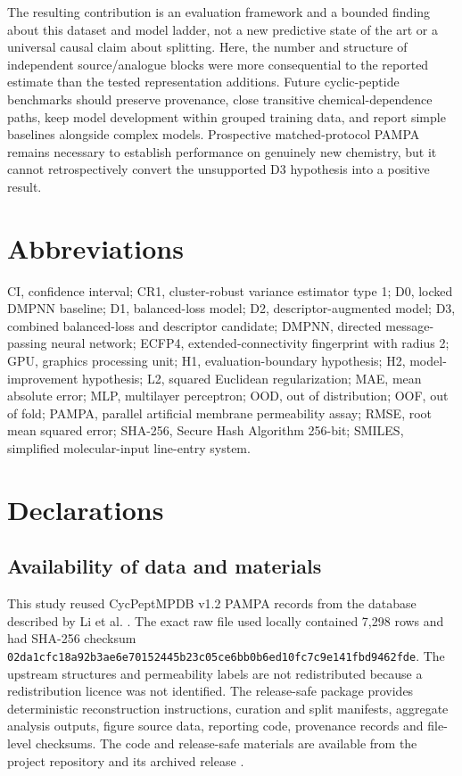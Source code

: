 \documentclass[referee,lineno,pdflatex,sn-vancouver-num]{sn-jnl}
\begin{document}
The resulting contribution is an evaluation framework and a bounded finding about this dataset and model ladder, not a new predictive state of the art or a universal causal claim about splitting. Here, the number and structure of independent source/analogue blocks were more consequential to the reported estimate than the tested representation additions. Future cyclic-peptide benchmarks should preserve provenance, close transitive chemical-dependence paths, keep model development within grouped training data, and report simple baselines alongside complex models. Prospective matched-protocol PAMPA remains necessary to establish performance on genuinely new chemistry, but it cannot retrospectively convert the unsupported D3 hypothesis into a positive result.


\section*{Abbreviations}
CI, confidence interval; CR1, cluster-robust variance estimator type 1; D0, locked DMPNN baseline; D1, balanced-loss model; D2, descriptor-augmented model; D3, combined balanced-loss and descriptor candidate; DMPNN, directed message-passing neural network; ECFP4, extended-connectivity fingerprint with radius 2; GPU, graphics processing unit; H1, evaluation-boundary hypothesis; H2, model-improvement hypothesis; L2, squared Euclidean regularization; MAE, mean absolute error; MLP, multilayer perceptron; OOD, out of distribution; OOF, out of fold; PAMPA, parallel artificial membrane permeability assay; RMSE, root mean squared error; SHA-256, Secure Hash Algorithm 256-bit; SMILES, simplified molecular-input line-entry system.

\backmatter

\section*{Declarations}

\subsection*{Availability of data and materials}
This study reused CycPeptMPDB v1.2 PAMPA records from the database described by Li et al. \cite{li2023cycpeptmpdb}. The exact raw file used locally contained 7,298 rows and had SHA-256 checksum \texttt{02da1cfc18a92b3ae6e70152445b23c05ce6bb0b6ed10fc7c9e141fbd9462fde}. The upstream structures and permeability labels are not redistributed because a redistribution licence was not identified. The release-safe package provides deterministic reconstruction instructions, curation and split manifests, aggregate analysis outputs, figure source data, reporting code, provenance records and file-level checksums. The code and release-safe materials are available from the project repository \cite{scaffoldseal_github} and its archived release \cite{scaffoldseal_zenodo}.
\end{document}
